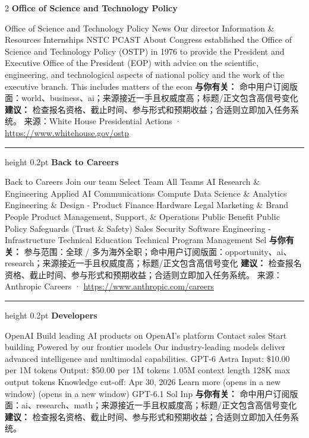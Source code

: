 \documentclass[10.5pt]{ctexart}
\begin{document}
\begin{multicols}{2}
{\large\bfseries Office of Science and Technology Policy}\par
Office of Science and Technology Policy News Our director Information \& Resources Internships NSTC PCAST About Congress established the Office of Science and Technology Policy (OSTP) in 1976 to provide the President and Executive Office of the President (EOP) with advice on the scientific, engineering, and technological aspects of national policy and the work of the executive branch. This includes matters of the econ
\textbf{与你有关：} 命中用户订阅版面：world、business、ai；来源接近一手且权威度高；标题/正文包含高信号变化
\textbf{建议：} 检查报名资格、截止时间、参与形式和预期收益；合适则立即加入任务系统。
{\footnotesize\color{ormuted} 来源：White House Presidential Actions · \url{https://www.whitehouse.gov/ostp}}
\vspace{2mm}
\hrule height 0.2pt
\vspace{2mm}
{\large\bfseries Back to Careers}\par
Back to Careers Join our team Select Team All Teams AI Research \& Engineering Applied AI Communications Compute Data Science \& Analytics Engineering \& Design - Product Finance Hardware Legal Marketing \& Brand People Product Management, Support, \& Operations Public Benefit Public Policy Safeguards (Trust \& Safety) Sales Security Software Engineering - Infrastructure Technical Education Technical Program Management Sel
\textbf{与你有关：} 参与范围：全球 / 多为海外全职；命中用户订阅版面：opportunity、ai、research；来源接近一手且权威度高；标题/正文包含高信号变化
\textbf{建议：} 检查报名资格、截止时间、参与形式和预期收益；合适则立即加入任务系统。
{\footnotesize\color{ormuted} 来源：Anthropic Careers · \url{https://www.anthropic.com/careers}}
\vspace{2mm}
\hrule height 0.2pt
\vspace{2mm}
{\large\bfseries Developers}\par
OpenAI Build leading AI products on OpenAI’s platform Contact sales Start building Powered by our frontier models Our industry-leading models deliver advanced intelligence and multimodal capabilities. GPT-6 Astra Input: \$10.00 per 1M tokens Output: \$50.00 per 1M tokens 1.05M context length 128K max output tokens Knowledge cut-off: Apr 30, 2026 Learn more (opens in a new window) (opens in a new window) GPT-6.1 Sol Inp
\textbf{与你有关：} 命中用户订阅版面：ai、research、math；来源接近一手且权威度高；标题/正文包含高信号变化
\textbf{建议：} 检查报名资格、截止时间、参与形式和预期收益；合适则立即加入任务系统。

\end{multicols}
\end{document}
